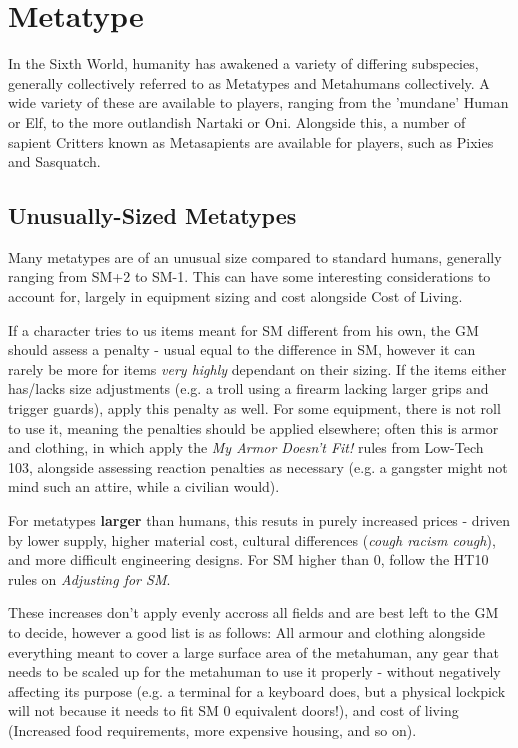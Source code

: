 \section{Metatype}

\begin{multicols*}{3}
	
	In the Sixth World, humanity has awakened a variety of differing subspecies, generally collectively referred to as Metatypes and Metahumans collectively. A wide variety of these are available to players, ranging from the 'mundane' Human or Elf, to the more outlandish Nartaki or Oni. Alongside this, a number of sapient Critters known as Metasapients are available for players, such as Pixies and Sasquatch.
	
	\subsection{Unusually-Sized Metatypes}
	
	Many metatypes are of an unusual size compared to standard humans, generally ranging from SM+2 to SM-1. This can have some interesting considerations to account for, largely in equipment sizing and cost alongside Cost of Living.
	
	If a character tries to us items meant for SM different from his own, the GM should assess a penalty - usual equal to the difference in SM, however it can rarely be more for items \textit{very highly} dependant on their sizing. If the items either has/lacks size adjustments (e.g. a troll using a firearm lacking larger grips and trigger guards), apply this penalty as well. For some equipment, there is not roll to use it, meaning the penalties should be applied elsewhere; often this is armor and clothing, in which apply the \textit{My Armor Doesn't Fit!} rules from Low-Tech 103, alongside assessing reaction penalties as necessary (e.g. a gangster might not mind such an attire, while a civilian would).
	
	For metatypes \textbf{larger} than humans, this resuts in purely increased prices - driven by lower supply, higher material cost, cultural differences (\textit{cough racism cough}), and  more difficult engineering designs. For SM higher than 0, follow the HT10 rules on \textit{Adjusting for SM}.
	
	These increases don't apply evenly accross all fields and are best left to the GM to decide, however a good list is as follows: All armour and clothing alongside everything meant to cover a large surface area of the metahuman, any gear that needs to be scaled up for the metahuman to use it properly - without negatively affecting its purpose (e.g. a terminal for a keyboard does, but a physical lockpick will not because it needs to fit SM 0 equivalent doors!), and cost of living (Increased food requirements, more expensive housing, and so on).
	

\end{multicols*}
